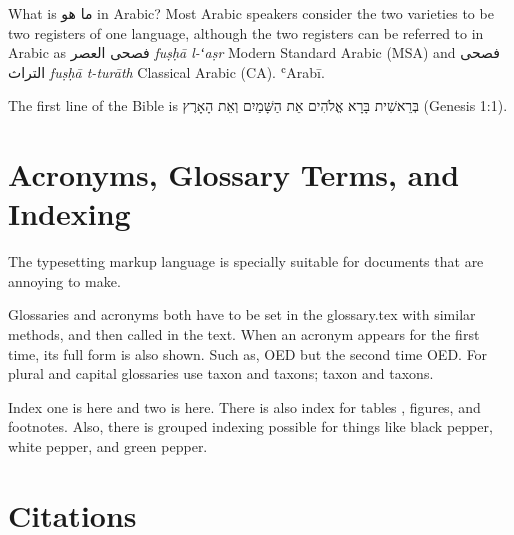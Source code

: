What is ما هو in Arabic?
\medskip
\textnormal
\noindent Most Arabic speakers consider the two varieties to be two registers
of one language, although the two registers can be referred to in
Arabic as فصحى العصر \textit{fuṣḥā l-ʻaṣr} Modern Standard Arabic (MSA) and
فصحى التراث \textit{fuṣḥā t-turāth} Classical Arabic (CA). ʿArab\={i}.

\medskip

The first line of the Bible is בְּרֵאשִׁית בָּרָא אֱלֹהִים אֵת הַשָּׁמַיִם וְאֵת הָאָרֶץ (Genesis 1:1).



\section{Acronyms, Glossary Terms, and Indexing}

The  typesetting markup language is specially suitable for documents that are annoying to make.

\bigskip

Glossaries and acronyms both have to be set in the glossary.tex with similar methods, and then called in the text. When an acronym appears for the first time, its full form is also shown. Such as, \gls{OED} but the second time \gls{OED}. For plural and capital glossaries use \gls{taxon} and \glspl{taxon}; \Gls{taxon} and \Glspl{taxon}.

Index one is here and  two is here. There is also index for tables , figures, and footnotes.
Also, there is grouped indexing possible for things like black pepper, white pepper, and green pepper. 


\section{Citations}

